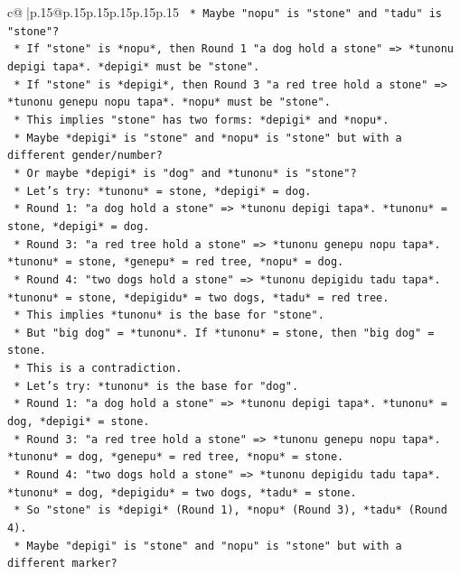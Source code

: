 \documentclass{article}
\begin{document}
{\begin{supertabular}{c@{$\;$}|p{.15\linewidth}@{}p{.15\linewidth}p{.15\linewidth}p{.15\linewidth}p{.15\linewidth}p{.15\linewidth}}
{{{\texttt{        *   Maybe "nopu" is "stone" and "tadu" is "stone"?} \\
\texttt{        *   If "stone" is *nopu*, then Round 1 "a dog hold a stone" => *tunonu depigi tapa*. *depigi* must be "stone".} \\
\texttt{        *   If "stone" is *depigi*, then Round 3 "a red tree hold a stone" => *tunonu genepu nopu tapa*. *nopu* must be "stone".} \\
\texttt{        *   This implies "stone" has two forms: *depigi* and *nopu*.} \\
\texttt{        *   Maybe *depigi* is "stone" and *nopu* is "stone" but with a different gender/number?} \\
\texttt{        *   Or maybe *depigi* is "dog" and *tunonu* is "stone"?} \\
\texttt{        *   Let's try: *tunonu* = stone, *depigi* = dog.} \\
\texttt{        *   Round 1: "a dog hold a stone" => *tunonu depigi tapa*. *tunonu* = stone, *depigi* = dog.} \\
\texttt{        *   Round 3: "a red tree hold a stone" => *tunonu genepu nopu tapa*. *tunonu* = stone, *genepu* = red tree, *nopu* = dog.} \\
\texttt{        *   Round 4: "two dogs hold a stone" => *tunonu depigidu tadu tapa*. *tunonu* = stone, *depigidu* = two dogs, *tadu* = red tree.} \\
\texttt{        *   This implies *tunonu* is the base for "stone".} \\
\texttt{        *   But "big dog" = *tunonu*. If *tunonu* = stone, then "big dog" = stone.} \\
\texttt{        *   This is a contradiction.} \\
\texttt{        *   Let's try: *tunonu* is the base for "dog".} \\
\texttt{        *   Round 1: "a dog hold a stone" => *tunonu depigi tapa*. *tunonu* = dog, *depigi* = stone.} \\
\texttt{        *   Round 3: "a red tree hold a stone" => *tunonu genepu nopu tapa*. *tunonu* = dog, *genepu* = red tree, *nopu* = stone.} \\
\texttt{        *   Round 4: "two dogs hold a stone" => *tunonu depigidu tadu tapa*. *tunonu* = dog, *depigidu* = two dogs, *tadu* = stone.} \\
\texttt{        *   So "stone" is *depigi* (Round 1), *nopu* (Round 3), *tadu* (Round 4).} \\
\texttt{        *   Maybe "depigi" is "stone" and "nopu" is "stone" but with a different marker?} \\
}}}
\end{supertabular}}
\end{document}
